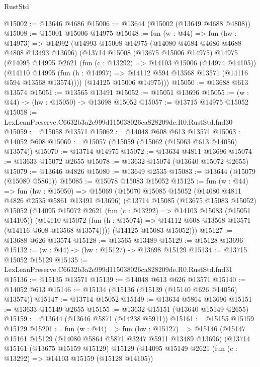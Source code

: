 \begin{lexlean}{RustStd}
\begin{coremodule}
@15002 := @13646 @4686
@15006 := @13644 (@15002 (@13649 @4688 @4808))
@15008 := @15001 @15006 @14975
@15048 := fun (w : @44) =>
  fun (hw : @14973) =>
  @14992
    (@14993
      @15008
      @14975
      (@14080 @4684 @4686 @4688 @4808 @13493 @13696)
      (@13714
        @15008
        (@13675 @15006 @14975)
        @14975
        (@14095
          @14995
          @2621
          (fun (c : @13292) => @14103 @15006 (@14974 @14105))
          (@14110
            @14995
            (fun (h : @14997) => @14112 @594 @13568 @13571 (@14116 @594 @13568 @13574))))
        (@14125 @15006 @14975)))
@15050 := @13688 @613 @13574
@15051 := @13565 @13491
@15052 := @15051 @13696
@15055 := (w : @44) -> (hw : @15050) -> @13698 @15052
@15057 := @13715 @14975 @15052
@15058 := LexLeanPreserve.C6632b3a2e999d115038026ca828209de.R0.RustStd.fnd30
@15059 := @15058 @13571
@15062 := @14048 @608 @613 @13571
@15063 := @14052 @608
@15069 := @15057 (@15059 (@15062 (@15063 @613 @14056) @13574))
@15070 := @13714 @14975
@15072 := @13634 @4811 @13696
@15074 := @13633 @15072 @2655
@15078 := @13632 @15074 (@13640 @15072 @2655)
@15079 := @13646 @4826
@15080 := @13649 @2535
@15083 := @13644 (@15079 (@15080 @5861))
@15085 := @15078 @15083 @15052
@15125 := fun (w : @44) =>
  fun (hw : @15050) =>
  @15069
    (@15070
      @15085
      @15052
      (@14080 @4811 @4826 @2535 @5861 @13491 @13696)
      (@13714
        @15085
        (@13675 @15083 @15052)
        @15052
        (@14095
          @15072
          @2621
          (fun (c : @13292) => @14103 @15083 (@15051 @14105))
          (@14110
            @15072
            (fun (h : @15074) => @14112 @608 @13568 @13571 (@14116 @608 @13568 @13574))))
        (@14125 @15083 @15052)))
@15127 := @13688 @626 @13574
@15128 := @13565 @13489
@15129 := @15128 @13696
@15132 := (w : @44) -> (hw : @15127) -> @13698 @15129
@15134 := @13715 @15052 @15129
@15135 := LexLeanPreserve.C6632b3a2e999d115038026ca828209de.R0.RustStd.fnd31
@15136 := @15135 @13571
@15139 := @14048 @613 @626 @13571
@15140 := @14052 @613
@15146 := @15134 (@15136 (@15139 (@15140 @626 @14056) @13574))
@15147 := @13714 @15052
@15149 := @13634 @5864 @13696
@15151 := @13633 @15149 @2655
@15155 := @13632 @15151 (@13640 @15149 @2655)
@15159 := @13644 (@13646 @5871 (@14238 @5911))
@15161 := @15155 @15159 @15129
@15201 := fun (w : @44) =>
  fun (hw : @15127) =>
  @15146
    (@15147
      @15161
      @15129
      (@14080 @5864 @5871 @3247 @5911 @13489 @13696)
      (@13714
        @15161
        (@13675 @15159 @15129)
        @15129
        (@14095
          @15149
          @2621
          (fun (c : @13292) => @14103 @15159 (@15128 @14105))

\end{coremodule}
\end{lexlean}
